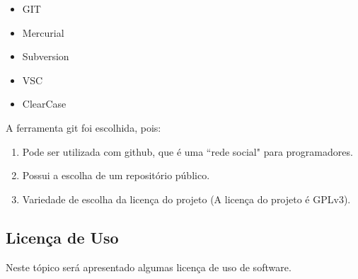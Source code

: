 \documentclass[12pt,a4paper]{article}
\begin{document}
\begin{itemize}
	\item GIT
	\item Mercurial
	\item Subversion
	\item VSC
	\item ClearCase
\end{itemize}

A ferramenta git foi escolhida, pois:

\begin{enumerate}
	\item Pode ser utilizada com github, que é uma ``rede social" para programadores.
	\item Possui a escolha de um repositório público.
	\item Variedade de escolha da licença do projeto (A licença do projeto é GPLv3).
\end{enumerate}

\subsection {Licença de Uso}
Neste tópico será apresentado algumas licença de uso de software.
\end{document}
